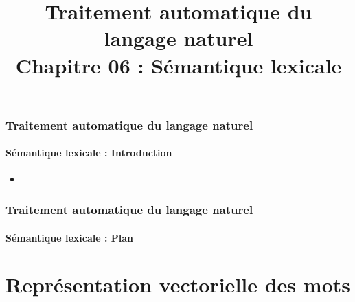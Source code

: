 \documentclass[xcolor=table]{beamer}
\title[TALN : 06- Sémantique lexicale]%
{Traitement automatique du langage naturel\\Chapitre 06 : Sémantique lexicale}
\begin{document}
	
\begin{frame}
\frametitle{Traitement automatique du langage naturel}
\framesubtitle{Sémantique lexicale : Introduction}

%		

\begin{itemize}
	\item 
\end{itemize}

\end{frame}

%
%

\begin{frame}
\frametitle{Traitement automatique du langage naturel}
\framesubtitle{Sémantique lexicale : Plan}

\begin{multicols}{2}
\tableofcontents
\end{multicols}
\end{frame}

\section{Représentation vectorielle des mots}
\end{document}
